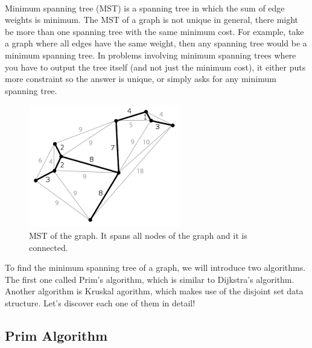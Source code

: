 \documentclass[12pt]{article}
\begin{document}
\paragraph{}
Minimum spanning tree (MST) is a spanning tree in which the sum of edge weights is minimum. The MST of a graph is not unique in general, there might be more than one spanning tree with the same minimum cost. For example, take a graph where all edges have the same weight, then any spanning tree would be a minimum spanning tree. In problems involving minimum spanning trees where you have to output the tree itself (and not just the minimum cost), it either puts more constraint so the answer is unique, or simply asks for any minimum spanning tree.

\begin{figure}[h!]
\begin{center}
\includegraphics[width=\linewidth/3]{mst.png}
  \end{center}
\caption{ MST of the graph. It spans all nodes of the graph and it is connected. }
  \label{fig}
\end{figure}

To find the minimum spanning tree of a graph, we will introduce two algorithms. The first one called Prim's algorithm, which is similar to Dijkstra's algorithm. Another algorithm is  Kruskal agorithm, which makes use of the disjoint set data structure. Let's discover each one of them in detail!

\newpage
\subsection{Prim Algorithm}
\end{document}
